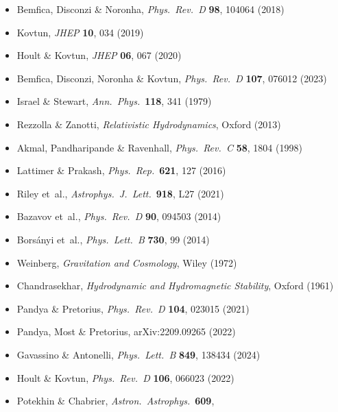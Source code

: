 \begin{itemize}
  \item Bemfica, Disconzi \& Noronha, \textit{Phys.\ Rev.\ D}
    \textbf{98}, 104064 (2018) \citep{BemficaDN2018}
  \item Kovtun, \textit{JHEP} \textbf{10}, 034 (2019) \citep{Kovtun2019}
  \item Hoult \& Kovtun, \textit{JHEP} \textbf{06}, 067 (2020)
    \citep{HoultKovtun2020}
  \item Bemfica, Disconzi, Noronha \& Kovtun, \textit{Phys.\ Rev.\ D}
    \textbf{107}, 076012 (2023) \citep{BemficaDNK2023}
  \item Israel \& Stewart, \textit{Ann.\ Phys.}\ \textbf{118}, 341
    (1979) \citep{IsraelStewart1979}
  \item Rezzolla \& Zanotti, \textit{Relativistic Hydrodynamics},
    Oxford (2013) \citep{RezzollaZanotti2013}
  \item Akmal, Pandharipande \& Ravenhall, \textit{Phys.\ Rev.\ C}
    \textbf{58}, 1804 (1998) \citep{AkmalPR1998}
  \item Lattimer \& Prakash, \textit{Phys.\ Rep.}\ \textbf{621}, 127
    (2016) \citep{LattimerPrakash2016}
  \item Riley et~al., \textit{Astrophys.\ J.\ Lett.}\ \textbf{918},
    L27 (2021) \citep{RileyEtAl2021}
  \item Bazavov et~al., \textit{Phys.\ Rev.\ D} \textbf{90}, 094503
    (2014) \citep{BazavovEtAl2014}
  \item Bors\'anyi et~al., \textit{Phys.\ Lett.\ B} \textbf{730}, 99
    (2014) \citep{BorsanyiEtAl2014}
  \item Weinberg, \textit{Gravitation and Cosmology}, Wiley (1972)
    \citep{Weinberg1972}
  \item Chandrasekhar, \textit{Hydrodynamic and Hydromagnetic Stability},
    Oxford (1961) \citep{Chandrasekhar1961}
  \item Pandya \& Pretorius, \textit{Phys.\ Rev.\ D} \textbf{104},
    023015 (2021) \citep{PandyaPretorius2021}
  \item Pandya, Most \& Pretorius, arXiv:2209.09265 (2022)
    \citep{PandyaMostPretorius2022ideal}
  \item Gavassino \& Antonelli, \textit{Phys.\ Lett.\ B} \textbf{849},
    138434 (2024) \citep{GavassinoAntonelli2024}
  \item Hoult \& Kovtun, \textit{Phys.\ Rev.\ D} \textbf{106},
    066023 (2022) \citep{HoultKovtun2022kinetic}
  \item Potekhin \& Chabrier, \textit{Astron.\ Astrophys.}\ \textbf{609},

\end{itemize}
